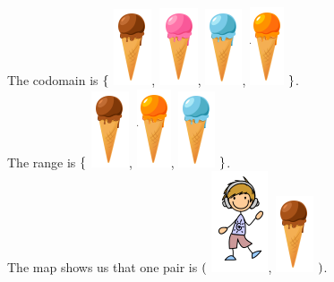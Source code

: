 \documentclass{ximera}
\begin{document}
\begin{example}
The codomain is $\Huge{ \{ }$ \includegraphics{pics/r1.png}, \includegraphics{pics/r2.png}, \includegraphics{pics/r3.png}, \includegraphics{pics/r4.png} $\Huge{ \} }$.
\quad \\

The range is $\Huge{ \{ }$ \includegraphics{pics/r1.png}, \includegraphics{pics/r4.png}, \includegraphics{pics/r3.png} $\Huge{ \} }$.
\quad \\

The map shows us that one pair is $\Huge{ ( }$ \includegraphics{pics/d1.png}, \includegraphics{pics/r1.png} $\Huge{ ) }$.

\end{example}
\end{document}
